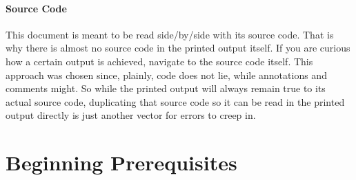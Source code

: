 \paragraph{Source Code}
This document is meant to be read side\-/by\-/side with its source code.
That is why there is almost no source code in the printed output itself.
If you are curious how a certain output is achieved, navigate to the source code
itself.
This approach was chosen since, plainly, code does not lie, while annotations and
comments might.
So while the printed output will always remain true to its actual source code,
duplicating that source code so it can be read in the printed output directly
is just another vector for errors to creep in.

\section*{Beginning Prerequisites}


